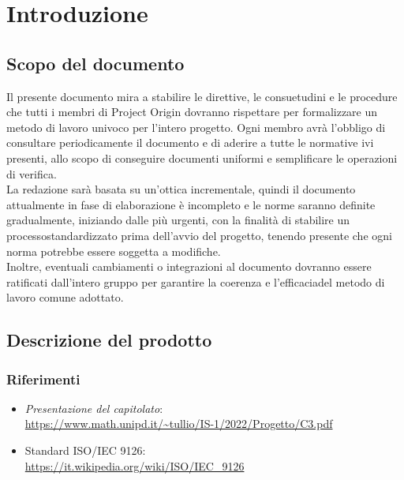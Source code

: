 \section{Introduzione}

\subsection{Scopo del documento}
Il presente documento mira a stabilire le direttive, le consuetudini e le procedure che tutti i membri di Project Origin dovranno rispettare per formalizzare un metodo di lavoro 
univoco per l'intero progetto. Ogni membro avrà l'obbligo di consultare periodicamente il documento e di aderire a tutte le normative ivi presenti, allo scopo di conseguire 
documenti uniformi e semplificare le operazioni di verifica\glo. \\ La redazione sarà basata su un'ottica incrementale, quindi il documento attualmente in fase di elaborazione è 
incompleto e le norme saranno definite gradualmente, iniziando dalle più urgenti, con la finalità di stabilire un processo\glo standardizzato prima dell'avvio del progetto, 
tenendo presente che ogni norma potrebbe essere soggetta a modifiche. \\ Inoltre, eventuali cambiamenti o integrazioni al documento dovranno essere ratificati dall’intero 
gruppo per garantire la coerenza e l'efficacia\glo del metodo di lavoro comune adottato.


\subsection{Descrizione del prodotto}

\subsubsection{Riferimenti}
\begin{itemize}
    \item \textit{Presentazione del capitolato}: \\ \url{https://www.math.unipd.it/~tullio/IS-1/2022/Progetto/C3.pdf}
    \item Standard ISO/IEC 9126\glo: \\ \url{https://it.wikipedia.org/wiki/ISO/IEC_9126}  
\end{itemize}